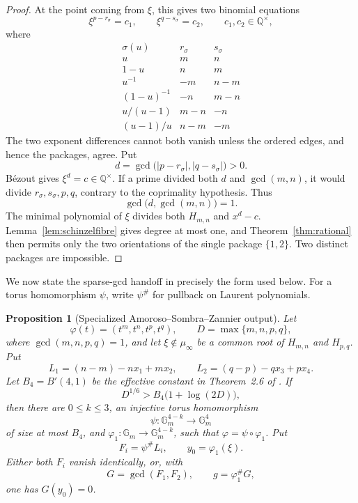 \documentclass[11pt]{article}
\newtheorem{proposition}[theorem]{Proposition}
\theoremstyle{definition}
\newcommand{\Q}{\mathbb Q}
\begin{document}
\begin{proof}
At the point coming from \(\xi\), this gives two binomial equations
\[
 \xi^{p-r_\sigma}=c_1,
 \qquad
 \xi^{q-s_\sigma}=c_2,
 \qquad c_1,c_2\in\Q^\times,
\]
where
\[
\begin{array}{c|cc}
 \sigma(u)&r_\sigma&s_\sigma\\ \hline
 u&m&n\\
 1-u&n&m\\
 u^{-1}&-m&n-m\\
 (1-u)^{-1}&-n&m-n\\
 u/(u-1)&m-n&-n\\
 (u-1)/u&n-m&-m
\end{array}
\]
The two exponent differences cannot both vanish unless the ordered edges,
and hence the packages, agree.  Put
\[
 d=\gcd\bigl(|p-r_\sigma|,|q-s_\sigma|\bigr)>0.
\]
Bézout gives \(\xi^d=c\in\Q^\times\).  If a prime divided both \(d\)
and \(\gcd(m,n)\), it would divide \(r_\sigma,s_\sigma,p,q\), contrary
to the coprimality hypothesis.  Thus
\[
 \gcd\bigl(d,\gcd(m,n)\bigr)=1.
\]
The minimal polynomial of \(\xi\) divides both \(H_{m,n}\) and
\(x^d-c\).  Lemma~\ref{lem:schinzelfibre} gives degree at most one, and
Theorem~\ref{thm:rational} then permits only the two orientations of the
single package \(\{1,2\}\).  Two distinct packages are impossible.
\end{proof}

We now state the sparse-gcd handoff in precisely the form used below.  For a
torus homomorphism \(\psi\), write \(\psi^\#\) for pullback on Laurent
polynomials.

\begin{proposition}[Specialized Amoroso--Sombra--Zannier output]
\label{prop:aszspecial}
Let
\[
 \varphi(t)=(t^m,t^n,t^p,t^q),
 \qquad
 D=\max\{m,n,p,q\},
\]
where \(\gcd(m,n,p,q)=1\), and let \(\xi\notin\mu_\infty\) be a common
root of \(H_{m,n}\) and \(H_{p,q}\).  Put
\[
 L_1=(n-m)-nx_1+mx_2,
 \qquad
 L_2=(q-p)-qx_3+px_4.
\]
Let \(B_4=B'(4,1)\) be the effective constant in Theorem~2.6 of
\cite{AmorosoSombraZannier2017}.  If
\begin{equation}
 D^{1/6}>B_4\bigl(1+\log(2D)\bigr),
 \tag{17.3}
\end{equation}
then there are \(0\leq k\leq3\), an injective torus homomorphism
\[
 \psi:\mathbb G_m^{4-k}\longrightarrow\mathbb G_m^4
\]
of size at most \(B_4\), and
\(\varphi_1:\mathbb G_m\to\mathbb G_m^{4-k}\), such that
\(\varphi=\psi\circ\varphi_1\).  Put
\[
 F_i=\psi^\#L_i,
 \qquad y_0=\varphi_1(\xi).
\]
Either both \(F_i\) vanish identically, or, with
\[
 G=\gcd(F_1,F_2),
 \qquad g=\varphi_1^\#G,
\]
one has \(G(y_0)=0\).
\end{proposition}
\end{document}
